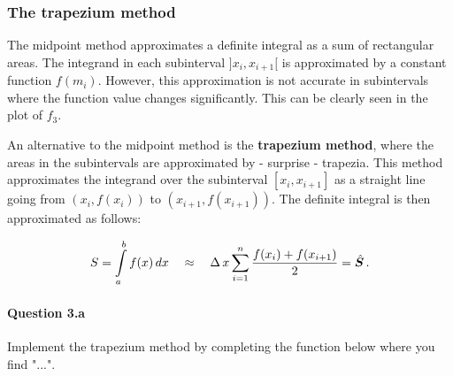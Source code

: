 \subsubsection{The trapezium method}\label{pc:integratie_TM}
The midpoint method approximates a definite integral as a sum of rectangular areas.
The integrand in each subinterval $]x_i,x_{i+1}[$ is approximated by a constant function $f(m_i)$. However, this approximation is not accurate in subintervals where the function value changes significantly. This can be clearly seen in the plot of $f_3$.

An alternative to the midpoint method is the \textbf{trapezium method}, where the areas in the subintervals are approximated by - surprise - trapezia.
This method approximates the integrand over the subinterval $[x_i,x_{i+1}]$ as a straight line going from $\left(x_i,f(x_i)\right)$ to $\left(x_{i+1} ,f(x_{i+1})\right)$. The definite integral is then approximated as follows:

\begin{equation}\label{eq:trapezium1}
S = \ds\int\limits^b_a{f(x)}\,dx \quad\approx\quad \Delta\,x \sum \limits^{n}_{i=1} \dfrac{f(x_i)+f(x_{i+1})}{2} = \hat{S}\, .
\end{equation} 



\paragraph{Question 3.a}
Implement the trapezium method by completing the function below where you find "...".


